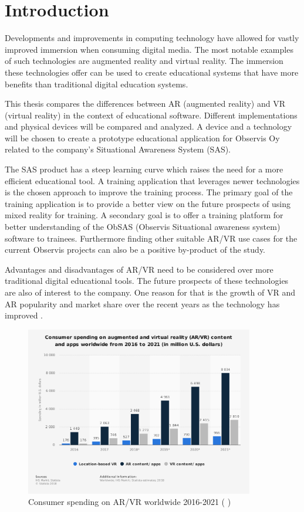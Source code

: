 \documentclass[12pt, a4paper,oneside, nocenter]{thesis}
\newcommand{\citeyeartitlexamkinline}[1]{(\usebibentry{#1}{title} \citeyear{#1})}
\begin{document}
\chapter{\texorpdfstring{Introduction}{introduction}}
Developments and improvements in computing technology have allowed for vastly improved immersion when consuming digital media. The most notable examples of such technologies are augmented reality and virtual reality. The immersion these technologies offer can be used to create educational systems that have more benefits than traditional digital education systems. \par
This thesis compares the differences between AR (augmented reality) and VR (virtual reality) in the context of educational software. Different implementations and physical devices will be compared and analyzed. A device and a technology will be chosen to create a prototype educational application for Observis Oy related to the company's Situational Awareness System (SAS).
\par
The SAS product has a steep learning curve which raises the need for a more efficient educational tool. A training application that leverages newer technologies is the chosen approach to improve the training process. The primary goal of the training application is to provide a better view on the future prospects of using mixed reality for training. A secondary goal is to offer a training platform for better understanding of the ObSAS (Observis Situational awareness system) software to trainees. Furthermore finding other suitable AR/VR use cases for the current Observis projects can also be a positive by-product of the study.
\par
Advantages and disadvantages of AR/VR need to be considered over more traditional digital educational tools. The future prospects of these technologies are also of interest to the company. One reason for that is the growth of VR and AR popularity and market share over the recent years as the technology has improved .
\begin{figure}[H]
	\centering
	\includegraphics[height=210pt]{ar-vr-consumer-spending}
	\caption{Consumer spending on AR/VR worldwide 2016-2021 \citeyeartitlexamkinline{ar-vr-chart}}
	\label{fig:ar-vr-consumer-spending}
\end{figure}
\end{document}
